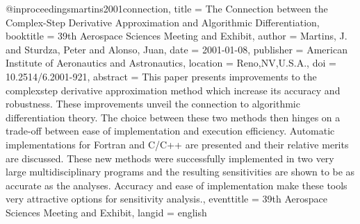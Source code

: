 @inproceedings{martins2001connection,
  title = {The Connection between the Complex-Step Derivative Approximation and Algorithmic Differentiation},
  booktitle = {39th {{Aerospace Sciences Meeting}} and {{Exhibit}}},
  author = {Martins, J. and Sturdza, Peter and Alonso, Juan},
  date = {2001-01-08},
  publisher = {{American Institute of Aeronautics and Astronautics}},
  location = {Reno,NV,U.S.A.},
  doi = {10.2514/6.2001-921},
  abstract = {This paper presents improvements to the complexstep derivative approximation method which increase its accuracy and robustness. These improvements unveil the connection to algorithmic differentiation theory. The choice between these two methods then hinges on a trade-off between ease of implementation and execution efficiency. Automatic implementations for Fortran and C/C++ are presented and their relative merits are discussed. These new methods were successfully implemented in two very large multidisciplinary programs and the resulting sensitivities are shown to be as accurate as the analyses. Accuracy and ease of implementation make these tools very attractive options for sensitivity analysis.},
  eventtitle = {39th {{Aerospace Sciences Meeting}} and {{Exhibit}}},
  langid = {english}
}

